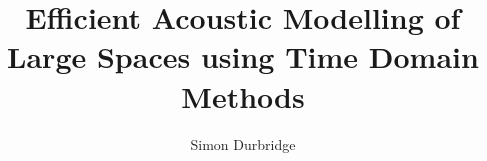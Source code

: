\documentclass[graybox,envcountchap,sectrefs]{report}
\begin{document}
\author{Simon Durbridge} %

\title{Efficient Acoustic Modelling of Large Spaces using Time Domain Methods} %

\maketitle

%
%
%
\tableofcontents




%




%
%

\end{document}
